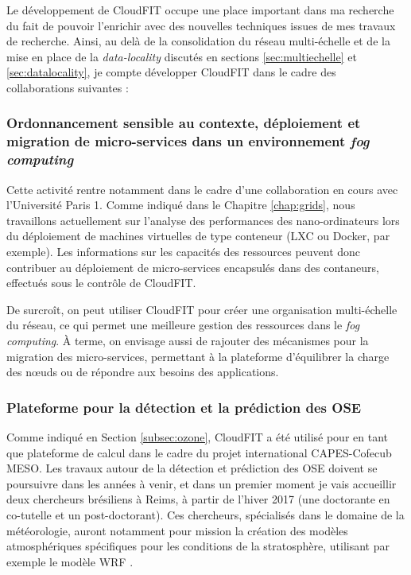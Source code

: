 
Le développement de CloudFIT occupe une place important dans ma recherche du fait de pouvoir l'enrichir avec des nouvelles techniques issues de mes travaux de recherche. Ainsi, au delà de la consolidation du réseau multi-échelle et de la mise en place de la \textit{data-locality} discutés en sections \ref{sec:multiechelle} et \ref{sec:datalocality}, je compte développer CloudFIT dans le cadre des collaborations suivantes : 


\subsubsection*{Ordonnancement sensible au contexte, déploiement et migration de micro-services  dans un environnement \textit{fog computing}}

Cette activité rentre notamment dans le cadre d'une collaboration en cours avec l'Université Paris 1. Comme indiqué dans le Chapitre \ref{chap:grids}, nous travaillons actuellement sur l'analyse des performances des nano-ordinateurs lors du déploiement de machines virtuelles de type conteneur (LXC ou Docker, par exemple). Les informations sur les capacités des ressources peuvent donc contribuer au déploiement de micro-services encapsulés dans des contaneurs, effectués sous le contrôle de CloudFIT. 

De surcroît, on peut utiliser CloudFIT pour créer une organisation multi-échelle du réseau, ce qui permet une meilleure gestion des ressources dans le \textit{fog computing}. À terme, on envisage aussi de rajouter des mécanismes pour la migration des micro-services, permettant à la plateforme d'équilibrer la charge des n{\oe}uds ou de répondre aux besoins des applications. 

\subsubsection*{Plateforme pour la détection et la prédiction des OSE}

Comme indiqué en Section \ref{subsec:ozone}, CloudFIT a été utilisé pour en tant que plateforme de calcul dans le cadre du projet international CAPES-Cofecub MESO. Les travaux autour de la détection et prédiction des OSE doivent se poursuivre dans les années à venir, et dans un premier moment je vais accueillir deux chercheurs brésiliens à Reims, à partir de l'hiver 2017 (une doctorante en co-tutelle et un post-doctorant). Ces chercheurs, spécialisés dans le domaine de la météorologie, auront notamment pour mission la création des modèles atmosphériques spécifiques pour les conditions de la stratosphère, utilisant par exemple le modèle WRF \cite{Skamarock08a}. 

